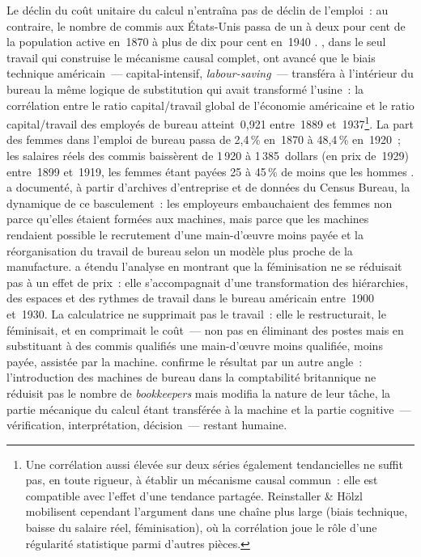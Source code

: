 %
Le déclin du coût unitaire du calcul n'entraîna pas de déclin de l'emploi~: au contraire, le nombre de commis aux États-Unis passa de un à deux pour cent de la population active en~1870 à plus de dix pour cent en~1940 \parencite{cortada_before_1993}. \textcite{reinstaller_market_2001}, dans le seul travail qui construise le mécanisme causal complet, ont avancé que le biais technique américain~--- capital-intensif, \emph{labour-saving}~--- transféra à l'intérieur du bureau la même logique de substitution qui avait transformé l'usine~: la corrélation entre le ratio capital/travail global de l'économie américaine et le ratio capital/travail des employés de bureau atteint~0,921 entre~1889 et~1937\footnote{Une corrélation aussi élevée sur deux séries également tendancielles ne suffit pas, en toute rigueur, à établir un mécanisme causal commun~: elle est compatible avec l'effet d'une tendance partagée. Reinstaller \& Hölzl mobilisent cependant l'argument dans une chaîne plus large (biais technique, baisse du salaire réel, féminisation), où la corrélation joue le rôle d'une régularité statistique parmi d'autres pièces.}. La part des femmes dans l'emploi de bureau passa de 2,4\,\% en~1870 à 48,4\,\% en~1920~; les salaires réels des commis baissèrent de 1\,920 à 1\,385~dollars (en prix de~1929) entre~1899 et~1919, les femmes étant payées 25 à 45\,\% de moins que les hommes \parencite{reinstaller_market_2001}. \textcite{davies_womans_1982} a documenté, à partir d'archives d'entreprise et de données du Census Bureau, la dynamique de ce basculement~: les employeurs embauchaient des femmes non parce qu'elles étaient formées aux machines, mais parce que les machines rendaient possible le recrutement d'une main-d'\oe{}uvre moins payée et la réorganisation du travail de bureau selon un modèle plus proche de la manufacture. \textcite{strom_beyond_1992} a étendu l'analyse en montrant que la féminisation ne se réduisait pas à un effet de prix~: elle s'accompagnait d'une transformation des hiérarchies, des espaces et des rythmes de travail dans le bureau américain entre~1900 et~1930. La calculatrice ne supprimait pas le travail~: elle le restructurait, le féminisait, et en comprimait le coût~--- non pas en éliminant des postes mais en substituant à des commis qualifiés une main-d'\oe{}uvre moins qualifiée, moins payée, assistée par la machine. \textcite{wootton_making_2007} confirme le résultat par un autre angle~: l'introduction des machines de bureau dans la comptabilité britannique ne réduisit pas le nombre de \emph{bookkeepers} mais modifia la nature de leur tâche, la partie mécanique du calcul étant transférée à la machine et la partie cognitive~--- vérification, interprétation, décision~--- restant humaine.

